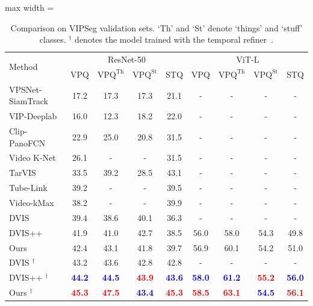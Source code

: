 


\begin{table}[t!]
\centering
\normalsize
\caption{Comparison on VIPSeg validation sets. `Th' and `St' denote `things' and `stuff' classes. $^\dagger$ denotes the model trained with the temporal refiner~\citep{DVIS}.}
\begin{adjustbox}{max width = \textwidth}
\begin{tabular}{l|cccc|cccc}
\toprule
\multirow{2}{*}{Method} & \multicolumn{4}{c|}{ResNet-50} & \multicolumn{4}{c}{ViT-L} \\
  & VPQ  & $\text{VPQ}^{\text{Th}}$ & $\text{VPQ}^{\text{St}}$ & STQ & VPQ  & $\text{VPQ}^{\text{Th}}$ & $\text{VPQ}^{\text{St}}$ & STQ \\
\hline
  VPSNet-SiamTrack\citep{woo2021learning} & 17.2 & 17.3  & 17.3  & 21.1& -& -& -& -\\
  VIP-Deeplab\citep{qiao2021vip} & 16.0 & 12.3  & 18.2  & 22.0 & -& -& -& -\\
  Clip-PanoFCN\citep{miao2022large} & 22.9 & 25.0  & 20.8  & 31.5 & -& -& -& -\\
  Video K-Net \citep{li2022video} & 26.1 & - & - & 31.5 & -& -& -& -\\
  TarVIS\citep{athar2023tarvis} & 33.5 & 39.2  & 28.5  &43.1 & -& -& -& -\\
  Tube-Link\citep{li2023tube} & 39.2 & - & - & 39.5 & -& -& -& -\\
  Video-kMax \citep{shin2024video} & 38.2 & - & - & 39.9 & -& -& -& -\\
  DVIS \citep{DVIS}& 39.4 & 38.6  & 40.1  & 36.3 & -& -& -& -\\
  DVIS++ \citep{zhang2023dvis++} & 41.9 & 41.0  & 42.7  & 38.5 & 56.0 & 58.0  & 54.3  & 49.8\\
  Ours& 42.4 & 43.1  & 41.8  & 39.7 & 56.9 & 60.1  & 54.2  & 51.0\\
  DVIS $^\dagger$ \citep{DVIS}& 43.2 & 43.6  & 42.8  & 42.8 & -& -& -& -\\
  DVIS++ $^\dagger$ \citep{zhang2023dvis++}& \textbf{\textcolor{blue}{44.2}} & \textbf{\textcolor{blue}{44.5}}  & \textbf{\textcolor{red}{43.9}}  & \textbf{\textcolor{blue}{43.6}} & \textbf{\textcolor{blue}{58.0}} & \textbf{\textcolor{blue}{61.2}}  & \textbf{\textcolor{red}{55.2}}  & \textbf{\textcolor{blue}{56.0}}\\
  Ours $^\dagger$ & \textbf{\textcolor{red}{45.3}} & \textbf{\textcolor{red}{47.5}}  & \textbf{\textcolor{blue}{43.4}}  & \textbf{\textcolor{red}{45.3}} & \textbf{\textcolor{red}{58.5}}& \textbf{\textcolor{red}{63.1}} & \textbf{\textcolor{blue}{54.5}} & \textbf{\textcolor{red}{56.1}} \\
\bottomrule
\end{tabular}
\end{adjustbox}
\label{tab:vps}
\end{table}

